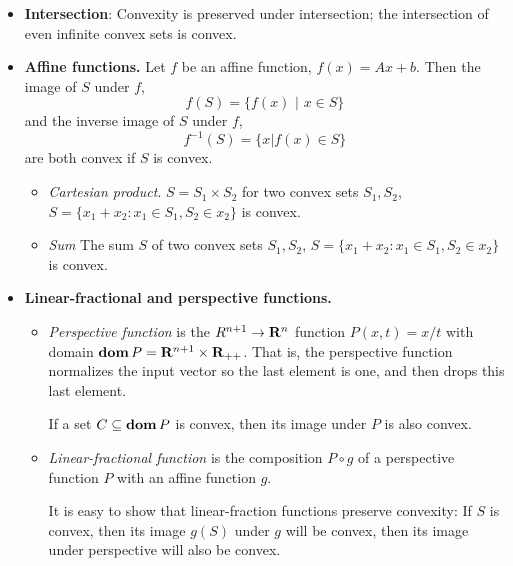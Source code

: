 \documentclass[a4paper, oneside]{book}
\begin{document}
\begin{itemize}
\item \textbf{Intersection}: Convexity is preserved under intersection; the intersection of even infinite convex sets is convex.
\item \textbf{Affine functions.} Let $f$ be an affine function, \ie $f(x)=Ax+b$. Then the image of $S$ under $f$, $$f(S) = \{f(x) \,\,|\,\, x \in S\}$$
and the inverse image of $S$ under $f$, $$f^{-1}(S) = \{x | f(x) \in S \}$$
are both convex if $S$ is convex.
	\begin{itemize}
	\item \textit{Cartesian product}. $S=S_1\times S_2$ for two convex sets $S_1, S_2$, $S=\{x_1 + x_2 : x_1 \in S_1, S_2 \in x_2\}$ is convex.
	\item \textit{Sum} The sum $S$ of two convex sets $S_1, S_2$, $S=\{x_1 + x_2 : x_1 \in S_1, S_2 \in x_2\}$ is convex.
	\end{itemize}
\item \textbf{Linear-fractional and perspective functions.} 
	\begin{itemize}
	\item \textit{Perspective function} is the $R^{n+1} \to \mathbf R^n $ function  $P(x,t) = x/t$ with domain $\textbf{dom}\,P = \mathbf R ^{n+1} \times \mathbf R_{++}$. That is, the perspective function normalizes the input vector so the last element is one, and then drops this last element.
	
	If a set $C \subseteq \textbf{dom}\,P$ is convex, then its image under $P$ is also convex. 
	\item \textit{Linear-fractional function} is the composition $P \circ g$ of a perspective function $P$ with an affine function $g$.
	
	It is easy to show that linear-fraction functions preserve convexity: If $S$ is convex, then  its image $g(S)$ under $g$ will be convex, then its image under perspective will also be convex. 
	\end{itemize}
\end{itemize}
\end{document}
